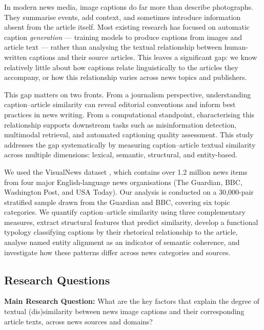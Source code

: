 \documentclass[11pt,a4paper]{article}
\begin{document}
In modern news media, image captions do far more than describe photographs.
They summarise events, add context, and sometimes introduce information
absent from the article itself. Most existing research has focused on
automatic caption \textit{generation} --- training models to produce captions
from images and article text --- rather than analysing the textual
relationship between human-written captions and their source articles. This
leaves a significant gap: we know relatively little about how captions relate
linguistically to the articles they accompany, or how this relationship varies
across news topics and publishers.

This gap matters on two fronts. From a journalism perspective, understanding
caption--article similarity can reveal editorial conventions and inform best
practices in news writing. From a computational standpoint, characterising
this relationship supports downstream tasks such as misinformation detection,
multimodal retrieval, and automated captioning quality assessment. This study
addresses the gap systematically by measuring caption--article textual
similarity across multiple dimensions: lexical, semantic, structural, and
entity-based.

We used the VisualNews dataset \citep{liu2021visualnews}, which contains over
1.2 million news items from four major English-language news organisations
(The Guardian, BBC, Washington Post, and USA Today). Our analysis is conducted
on a 30,000-pair stratified sample drawn from the Guardian and BBC, covering
six topic categories. We quantify caption--article similarity using three
complementary measures, extract structural features that predict similarity,
develop a functional typology classifying captions by their rhetorical
relationship to the article, analyse named entity alignment as an indicator
of semantic coherence, and investigate how these patterns differ across news
categories and sources.

\subsection{Research Questions}

\noindent\textbf{Main Research Question:} What are the key factors that
explain the degree of textual (dis)similarity between news image captions
and their corresponding article texts, across news sources and domains?
\end{document}
